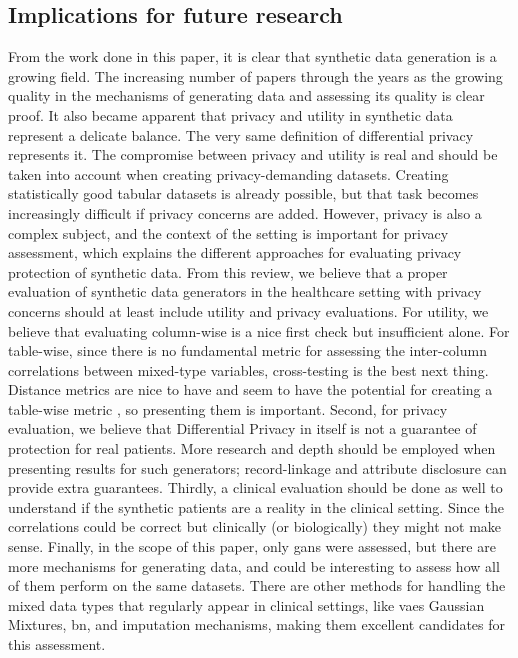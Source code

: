 \subsection{Implications for future research}
From the work done in this paper, it is clear that synthetic data generation is a growing field. The increasing number of papers through the years as the growing quality in the mechanisms of generating data and assessing its quality is clear proof. 
It also became apparent that privacy and utility in synthetic data represent a delicate balance. The very same definition of differential privacy represents it. The compromise between privacy and utility is real and should be taken into account when creating privacy-demanding datasets.
Creating statistically good tabular datasets is already possible, but that task becomes increasingly difficult if privacy concerns are added. 
However, privacy is also a complex subject, and the context of the setting is important for privacy assessment, which explains the different approaches for evaluating privacy protection of synthetic data.
From this review, we believe that a proper evaluation of synthetic data generators in the healthcare setting with privacy concerns should at least include utility and privacy evaluations. For utility, we believe that evaluating column-wise is a nice first check but insufficient alone.
For table-wise, since there is no fundamental metric for assessing the inter-column correlations between mixed-type variables, cross-testing is the best next thing. Distance metrics are nice to have and seem to have the potential for creating a table-wise metric \cite{metrics}, so presenting them is important. Second, for privacy evaluation, we believe that Differential Privacy in itself is not a guarantee of protection for real patients. More research and depth should be employed when presenting results for such generators; record-linkage and attribute disclosure can provide extra guarantees.
Thirdly, a clinical evaluation should be done as well to understand if the synthetic patients are a reality in the clinical setting. Since the correlations could be correct but clinically (or biologically) they might not make sense. Finally, in the scope of this paper, only \acp{gan} were assessed, but there are more mechanisms for generating data, and could be interesting to assess how all of them perform on the same datasets. There are other methods for handling the mixed data types that regularly appear in clinical settings, like \acp{vae} Gaussian Mixtures, \ac{bn}, and imputation mechanisms, making them excellent candidates for this assessment.



